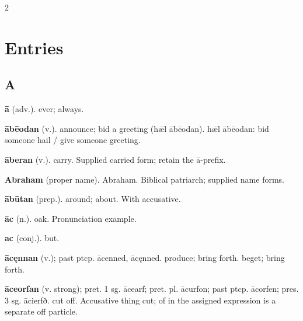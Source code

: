 \begin{multicols*}{2}
\section*{Entries}
\subsection*{A}
\textbf{ā} (adv.). ever; always.\par
\textbf{ābēodan} (v.). announce; bid a greeting (hǣl ābēodan). hǣl ābēodan: bid someone hail / give someone greeting.\par
\textbf{āberan} (v.). carry. Supplied carried form; retain the ā-prefix.\par
\textbf{Abraham} (proper name). Abraham. Biblical patriarch; supplied name forms.\par
\textbf{ābūtan} (prep.). around; about. With accusative.\par
\textbf{āc} (n.). oak. Pronunciation example.\par
\textbf{ac} (conj.). but.\par
\textbf{ācęnnan} (v.); past ptcp. ācenned, ācęnned. produce; bring forth. beget; bring forth.\par
\textbf{āceorfan} (v. strong); pret. 1 sg. ācearf; pret. pl. ācurfon; past ptcp. ācorfen; pres. 3 sg. ācierfð. cut off. Accusative thing cut; of in the assigned expression is a separate off particle.\par

\end{multicols*}
